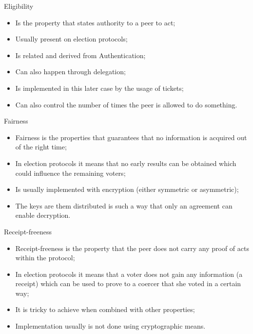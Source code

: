 \documentclass[12pt,table,xcolor={dvipsnames}]{beamer}
\begin{document}
\begin{frame}{Eligibility}
\begin{itemize}
\item Is the property that states authority to a peer to act;\pause
\item Usually present on election protocols;\pause
\item Is related and derived from Authentication;\pause
\item Can also happen through delegation;\pause
\item Is implemented in this later case by the usage of tickets;\pause
\item Can also control the number of times the peer is allowed to do something.
\end{itemize}
\end{frame}

\begin{frame}{Fairness}
\begin{itemize}
\item Fairness is the properties that guarantees that no information is acquired out of the right time;\pause 
\item In election protocols it means that no early results can be obtained which could influence the remaining voters;\pause
\item Is usually implemented with encryption (either symmetric or asymmetric);\pause
\item The keys are them distributed is such a way that only an agreement can enable decryption.
\end{itemize}
\end{frame}

\begin{frame}{Receipt-freeness}
\begin{itemize}
\item Receipt-freeness is the property that the peer does not carry any proof of acts within the protocol;\pause
\item In election protocols it means that a voter does not gain any information (a receipt) which can be used to prove to a coercer that she voted in a certain way;\pause
\item It is tricky to achieve when combined with other properties;\pause
\item Implementation usually is not done using cryptographic means.
\end{itemize}
\end{frame}
\end{document}
